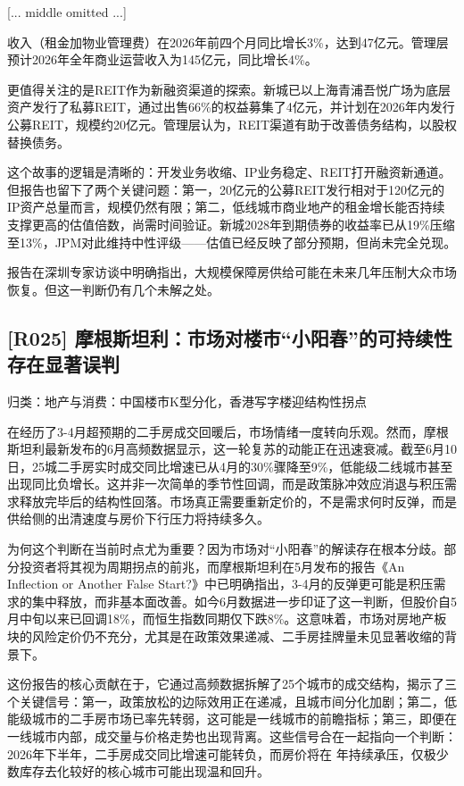 \documentclass[11pt]{ctexart}
\begin{document}
[... middle omitted ...]

收入（租金加物业管理费）在2026年前四个月同比增长3\%，达到47亿元。管理层预计2026年全年商业运营收入为145亿元，同比增长4\%。

更值得关注的是REIT作为新融资渠道的探索。新城已以上海青浦吾悦广场为底层资产发行了私募REIT，通过出售66\%的权益募集了4亿元，并计划在2026年内发行公募REIT，规模约20亿元。管理层认为，REIT渠道有助于改善债务结构，以股权替换债务。

这个故事的逻辑是清晰的：开发业务收缩、IP业务稳定、REIT打开融资新通道。但报告也留下了两个关键问题：第一，20亿元的公募REIT发行相对于120亿元的IP资产总量而言，规模仍然有限；第二，低线城市商业地产的租金增长能否持续支撑更高的估值倍数，尚需时间验证。新城2028年到期债券的收益率已从19\%压缩至13\%，JPM对此维持中性评级——估值已经反映了部分预期，但尚未完全兑现。

报告在深圳专家访谈中明确指出，大规模保障房供给可能在未来几年压制大众市场恢复。但这一判断仍有几个未解之处。

\subsection{[R025] 摩根斯坦利：市场对楼市“小阳春”的可持续性存在显著误判}
{\small\color{refgray}归类：地产与消费：中国楼市K型分化，香港写字楼迎结构性拐点}

在经历了3-4月超预期的二手房成交回暖后，市场情绪一度转向乐观。然而，摩根斯坦利最新发布的6月高频数据显示，这一轮复苏的动能正在迅速衰减。截至6月10日，25城二手房实时成交同比增速已从4月的30\%骤降至9\%，低能级二线城市甚至出现同比负增长。这并非一次简单的季节性回调，而是政策脉冲效应消退与积压需求释放完毕后的结构性回落。市场真正需要重新定价的，不是需求何时反弹，而是供给侧的出清速度与房价下行压力将持续多久。

为何这个判断在当前时点尤为重要？因为市场对“小阳春”的解读存在根本分歧。部分投资者将其视为周期拐点的前兆，而摩根斯坦利在5月发布的报告《An Inflection or Another False Start?》中已明确指出，3-4月的反弹更可能是积压需求的集中释放，而非基本面改善。如今6月数据进一步印证了这一判断，但股价自5月中旬以来已回调18\%，而恒生指数同期仅下跌8\%。这意味着，市场对房地产板块的风险定价仍不充分，尤其是在政策效果递减、二手房挂牌量未见显著收缩的背景下。

这份报告的核心贡献在于，它通过高频数据拆解了25个城市的成交结构，揭示了三个关键信号：第一，政策放松的边际效用正在递减，且城市间分化加剧；第二，低能级城市的二手房市场已率先转弱，这可能是一线城市的前瞻指标；第三，即便在一线城市内部，成交量与价格走势也出现背离。这些信号合在一起指向一个判断：2026年下半年，二手房成交同比增速可能转负，而房价将在 年持续承压，仅极少数库存去化较好的核心城市可能出现温和回升。
\end{document}
